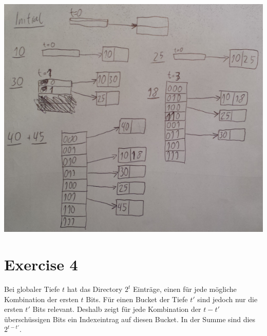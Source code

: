 \documentclass[10pt,a4paper]{article}
\begin{document}
\includegraphics[width=\textwidth]{sheet-10/exercise-3}

\section*{Exercise 4}

Bei globaler Tiefe $t$ hat das Directory $2^{t}$ Einträge, einen für jede mögliche Kombination der ersten $t$ Bits.
Für einen Bucket der Tiefe $t'$ sind jedoch nur die ersten $t'$ Bits relevant.
Deshalb zeigt für jede Kombination der $t - t'$ überschüssigen Bits ein Indexeintrag auf diesen Bucket.
In der Summe sind dies $2^{t - t'}$.
\end{document}
